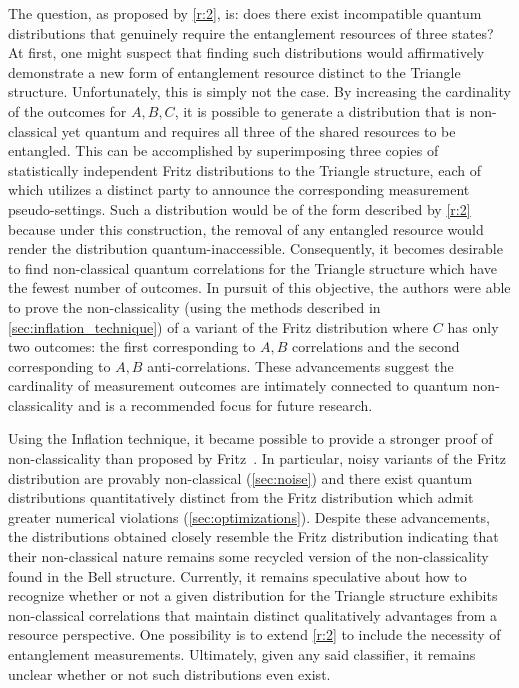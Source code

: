 \documentclass[aps, 10pt, english, twoside, pra, nofootinbib, tightenlines, longbibliography, superscriptaddress]{revtex4-1}
\begin{document}
    The question, as proposed by \ref{r:2}, is: does there exist incompatible quantum distributions that genuinely require the entanglement resources of three states? At first, one might suspect that finding such distributions would affirmatively demonstrate a new form of entanglement resource distinct to the Triangle structure. Unfortunately, this is simply not the case. By increasing the cardinality of the outcomes for $A, B, C$, it is possible to generate a distribution that is non-classical yet quantum and requires all three of the shared resources to be entangled. This can be accomplished by superimposing three copies of statistically independent Fritz distributions to the Triangle structure, each of which utilizes a distinct party to announce the corresponding measurement pseudo-settings. Such a distribution would be of the form described by \ref{r:2} because under this construction, the removal of any entangled resource would render the distribution quantum-inaccessible. Consequently, it becomes desirable to find non-classical quantum correlations for the Triangle structure which have the fewest number of outcomes. In pursuit of this objective, the authors were able to prove the non-classicality (using the methods described in \cref{sec:inflation_technique}) of a variant of the Fritz distribution where $C$ has only two outcomes: the first corresponding to $A, B$ correlations and the second corresponding to $A, B$ anti-correlations. These advancements suggest the cardinality of measurement outcomes are intimately connected to quantum non-classicality and is a recommended focus for future research.

    Using the Inflation technique, it became possible to provide a stronger proof of non-classicality than proposed by Fritz~\cite{Fritz_2012}. In particular, noisy variants of the Fritz distribution are provably non-classical (\cref{sec:noise}) and there exist quantum distributions quantitatively distinct from the Fritz distribution which admit greater numerical violations (\cref{sec:optimizations}). Despite these advancements, the distributions obtained closely resemble the Fritz distribution indicating that their non-classical nature remains some recycled version of the non-classicality found in the Bell structure. Currently, it remains speculative about how to recognize whether or not a given distribution for the Triangle structure exhibits non-classical correlations that maintain distinct qualitatively advantages from a resource perspective. One possibility is to extend \cref{r:2} to include the necessity of entanglement measurements. Ultimately, given any said classifier, it remains unclear whether or not such distributions even exist.
\end{document}
